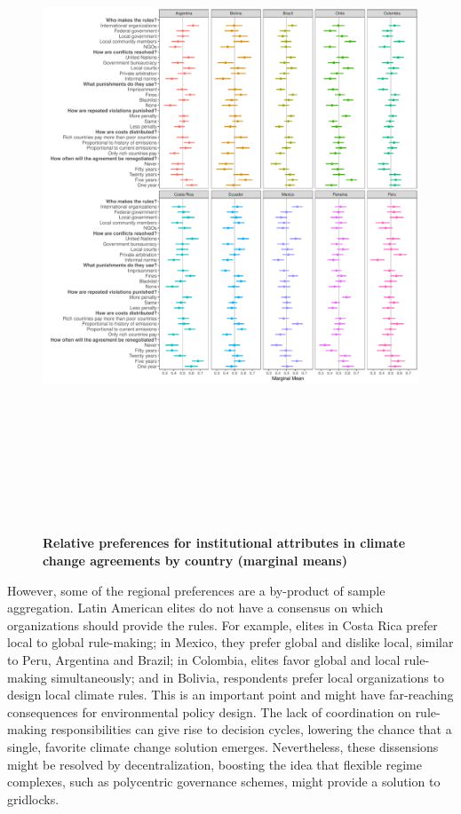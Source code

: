 \documentclass[a4paper,12pt]{article}
\begin{document}
\begin{figure}[htbp]
	\centering
	\includegraphics[width=\linewidth, height=20cm]{MM_country.pdf}
	\caption{\textbf{Relative preferences for institutional attributes in climate change agreements by country (marginal means)}}
	\label{fig:countries}
\end{figure}

However, some of the regional preferences are a by-product of sample aggregation. Latin American elites do not have a consensus on which organizations should provide the rules. For example, elites in Costa Rica prefer local to global rule-making; in Mexico, they prefer global and dislike local, similar to Peru, Argentina and Brazil; in Colombia, elites favor global and local rule-making simultaneously; and in Bolivia, respondents prefer local organizations to design local climate rules. This is an important point and might have far-reaching consequences for environmental policy design. The lack of coordination on rule-making responsibilities can give rise to decision cycles, lowering the chance that a single, favorite climate change solution emerges. Nevertheless, these dissensions might be resolved by decentralization, boosting the idea that flexible regime complexes, such as polycentric governance schemes, might provide a solution to gridlocks.
\end{document}
